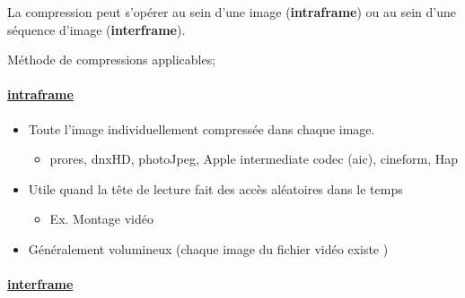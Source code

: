 \documentclass[
  french,
]{book}
\providecommand{\tightlist}{%
  \setlength{\itemsep}{0pt}\setlength{\parskip}{0pt}}
\begin{document}
La compression peut s'opérer au sein d'une image (\textbf{intraframe}) ou au sein d'une séquence d'image (\textbf{interframe}).

Méthode de compressions applicables;

\hypertarget{intraframe}{%
\paragraph{\texorpdfstring{\href{http://users.cs.cf.ac.uk/Dave.Marshall/Multimedia/node248.html}{intraframe}}{intraframe}}\label{intraframe}}

\begin{itemize}
\tightlist
\item
  Toute l'image individuellement compressée dans chaque image.

  \begin{itemize}
  \tightlist
  \item
    prores, dnxHD, photoJpeg, Apple intermediate codec (aic), cineform, Hap\\
  \end{itemize}
\item
  Utile quand la tête de lecture fait des accès aléatoires dans le temps

  \begin{itemize}
  \tightlist
  \item
    Ex. Montage vidéo
  \end{itemize}
\item
  Généralement volumineux (chaque image du fichier vidéo existe )
\end{itemize}

\hypertarget{interframe}{%
\paragraph{\texorpdfstring{\href{http://users.cs.cf.ac.uk/Dave.Marshall/Multimedia/node249.htmlhttps://en.wikipedia.org/wiki/Inter_frame}{interframe}}{interframe}}\label{interframe}}
\end{document}
